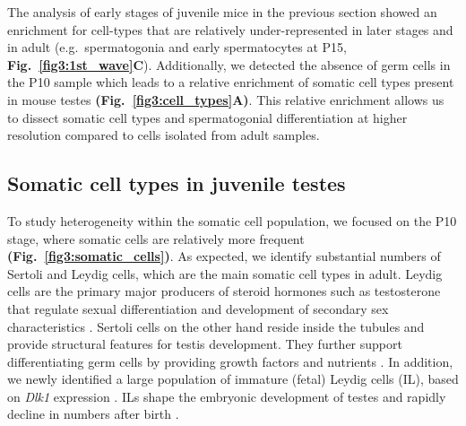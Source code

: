 The analysis of early stages of juvenile mice in the previous section showed an enrichment for cell-types that are relatively under-represented in later stages and in adult (e.g.~spermatogonia and early spermatocytes at P15, \textbf{Fig.~\ref{fig3:1st_wave}C}). Additionally, we detected the absence of germ cells in the P10 sample which leads to a relative enrichment of somatic cell types present in mouse testes \textbf{(Fig.~\ref{fig3:cell_types}A)}. This relative enrichment allows us to dissect somatic cell types and spermatogonial differentiation at higher resolution compared to cells isolated from adult samples.

\subsection{Somatic cell types in juvenile testes}

To study heterogeneity within the somatic cell population, we focused on the P10 stage, where somatic cells are relatively more frequent \textbf{(Fig.~\ref{fig3:somatic_cells})}. As expected, we identify substantial numbers of Sertoli and Leydig cells, which are the main somatic cell types in adult. Leydig cells are the primary major producers of steroid hormones such as testosterone that regulate sexual differentiation and development of secondary sex characteristics \citep{Svechnikov2010, Haider2004}. Sertoli cells on the other hand reside inside the tubules and provide structural features for testis development. They further support differentiating germ cells by providing growth factors and nutrients  \citep{Griswold1998}. In addition, we newly identified a large population of immature (fetal) Leydig cells (IL), based on \textit{Dlk1} expression \citep{Lottrup2014}. ILs shape the embryonic development of testes and rapidly decline in numbers after birth \citep{Griswold2009}. \\

